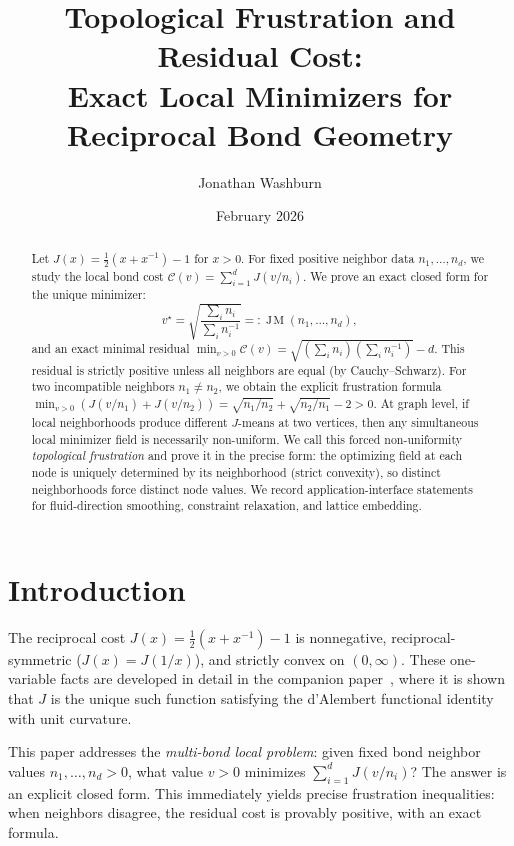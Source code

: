 \documentclass[11pt]{amsart}
\title[Topological Frustration]{Topological Frustration and Residual Cost:\\
Exact Local Minimizers for Reciprocal Bond Geometry}
\author{Jonathan Washburn}
\date{February 2026}
\theoremstyle{definition}
\theoremstyle{remark}
\DeclareMathOperator{\JM}{J\!M}
\begin{document}
\begin{abstract}
Let $J(x)=\frac12(x+x^{-1})-1$ for $x>0$.
For fixed positive neighbor data $n_1,\dots,n_d$, we study the local bond
cost $\mathcal C(v)=\sum_{i=1}^d J(v/n_i)$.
We prove an exact closed form for the unique minimizer:
\[
v^\star=\sqrt{\frac{\sum_i n_i}{\sum_i n_i^{-1}}}
=:\JM(n_1,\dots,n_d),
\]
and an exact minimal residual
$\min_{v>0}\mathcal C(v)=\sqrt{(\sum_i n_i)(\sum_i n_i^{-1})}-d$.
This residual is strictly positive unless all neighbors are equal
(by Cauchy--Schwarz).
For two incompatible neighbors $n_1\neq n_2$, we obtain the explicit
frustration formula
$\min_{v>0}(J(v/n_1)+J(v/n_2))=\sqrt{n_1/n_2}+\sqrt{n_2/n_1}-2>0$.
At graph level, if local neighborhoods produce different $J$-means at two
vertices, then any simultaneous local minimizer field is necessarily
non-uniform.  We call this forced non-uniformity \emph{topological
frustration} and prove it in the precise form:
the optimizing field at each node is uniquely determined by its
neighborhood (strict convexity), so distinct neighborhoods force distinct
node values.  We record application-interface statements for fluid-direction
smoothing, constraint relaxation, and lattice embedding.
\end{abstract}

\maketitle

\section{Introduction}\label{sec:intro}

The reciprocal cost $J(x)=\frac12(x+x^{-1})-1$ is nonnegative,
reciprocal-symmetric ($J(x)=J(1/x)$), and strictly convex on $(0,\infty)$.
These one-variable facts are developed in detail in the companion
paper~\cite{F1}, where it is shown that $J$ is the unique such function
satisfying the d'Alembert functional identity with unit curvature.

This paper addresses the \emph{multi-bond local problem}:
given fixed bond neighbor values $n_1,\dots,n_d>0$,
what value $v>0$ minimizes $\sum_{i=1}^d J(v/n_i)$?
The answer is an explicit closed form.  This immediately yields precise
frustration inequalities: when neighbors disagree, the residual cost is
provably positive, with an exact formula.
\end{document}
